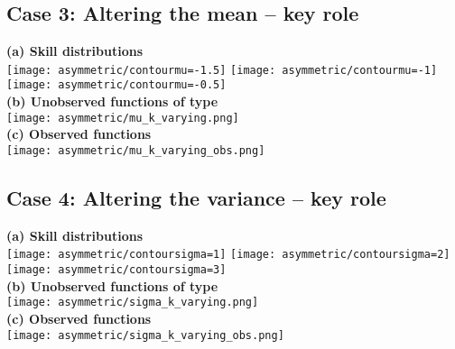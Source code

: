 \documentclass{article}
\begin{document}
			\clearpage
	\subsection*{Case 3: Altering the mean -- key role}
	\begin{center}
		\textbf{(a) Skill distributions}\\
		
		\texttt{[image: asymmetric/contourmu=-1.5]}\hfill
		\texttt{[image: asymmetric/contourmu=-1]}\hfill
		\texttt{[image: asymmetric/contourmu=-0.5]}\\
		
		\textbf{(b) Unobserved functions of type}\\
		
		\texttt{[image: asymmetric/mu\_k\_varying.png]} \\
		
		\textbf{(c) Observed functions}\\
		
		\texttt{[image: asymmetric/mu\_k\_varying\_obs.png]}
	\end{center}
	
				\clearpage
	\subsection*{Case 4: Altering the variance -- key role}
	\begin{center}
		\textbf{(a) Skill distributions}\\
		
		\texttt{[image: asymmetric/contoursigma=1]}\hfill
		\texttt{[image: asymmetric/contoursigma=2]}\hfill
		\texttt{[image: asymmetric/contoursigma=3]}\\
		
		\textbf{(b) Unobserved functions of type}\\
		
		\texttt{[image: asymmetric/sigma\_k\_varying.png]} \\
		
		\textbf{(c) Observed functions}\\
		
		\texttt{[image: asymmetric/sigma\_k\_varying\_obs.png]}
	\end{center}
\end{document}
